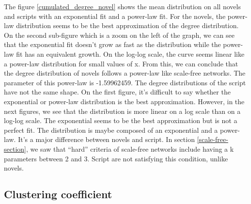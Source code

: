 \documentclass[a4paper, 12pt]{report}
\begin{document}
The figure \ref{cumulated_degree_novel} shows the mean distribution on all novels and scripts with an exponential fit and a power-law fit. For the novels, the power-law distribution seems to be the best approximation of the degree distribution. On the second sub-figure which is a zoom on the left of the graph, we can see that the exponential fit doesn't grow as fast as the distribution while the power-law fit has an equivalent growth. On the log-log scale, the curve seems linear like a power-law distribution for small values of x. From this, we can conclude that the degree distribution of novels follows a power-law like scale-free networks. The parameter of this power-law is -1.59962459.
The degree distributions of the script have not the same shape. On the first figure, it's difficult to say whether the exponential or power-law distribution is the best approximation. However, in the next figures, we see that the distribution is more linear on a log scale than on a log-log scale. The exponential seems to be the best approximation but is not a perfect fit. The distribution is maybe composed of an exponential and a power-law. It's a major difference between novels and script. In section \ref{scale-free-section}, we saw that ``hard'' criteria of scale-free networks include having a k parameters between 2 and 3. Script are not satisfying this condition, unlike novels.\\

\subsection{Clustering coefficient}
\end{document}
